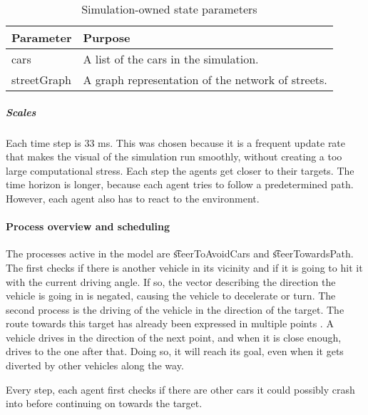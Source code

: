 	\begin{table}[H]
		\centering
		\begin{tabular}{|l | p{10.5cm} |}
			\hline
			Parameter				& Purpose \\ \hline \hline
			cars 					& A list of the cars in the simulation. \\ \hline
			streetGraph		 		& A graph representation of the network of streets. \\ \hline
		\end{tabular}
		\caption{Simulation-owned state parameters}
		\label{tab:par:method:model:overview:state:highlevel:sim}
	\end{table}


	\subparagraph{Scales}


	Each time step is 33 ms. This was chosen because it is a frequent update rate that makes the visual of the simulation run smoothly, without creating a too large computational stress. Each step the agents get closer to their targets. The time horizon is longer, because each agent tries to follow a predetermined path. However, each agent also has to react to the environment. 



\paragraph{Process overview and scheduling}
\label{par:method:model:overview:process}

The processes active in the model are \t{steerToAvoidCars} and \t{steerTowardsPath}. 
The first checks if there is another vehicle in its vicinity and if it is going to hit it with the current driving angle. If so, the vector describing the direction the vehicle is going in is negated, causing the vehicle to decelerate or turn.
The second process is the driving of the vehicle in the direction of the target. The route towards this target has already been expressed in multiple points . A vehicle drives in the direction of the next point, and when it is close enough, drives to the one after that. Doing so, it will reach its goal, even when it gets diverted by other vehicles along the way.

Every step, each agent first checks if there are other cars it could possibly crash into before continuing on towards the target. 

